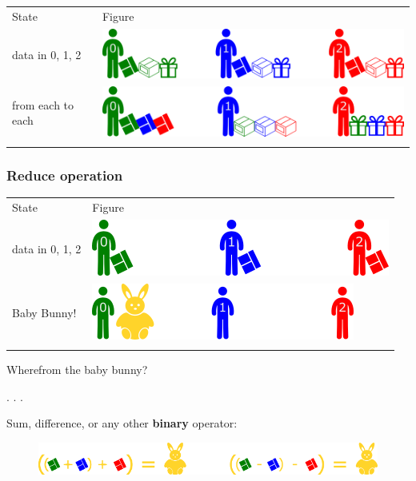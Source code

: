 \begin{longtable}[c]{@{}ll@{}}
\toprule\addlinespace
State & Figure
\\\addlinespace
\midrule\endhead
data in 0, 1, 2 & \includegraphics{06MPI/figures/all2all0.png}
\\\addlinespace
from each to each & \includegraphics{06MPI/figures/all2all1.png}
\\\addlinespace
\bottomrule
\end{longtable}

\subsubsection{Reduce operation}\label{reduce-operation}

\begin{longtable}[c]{@{}ll@{}}
\toprule\addlinespace
State & Figure
\\\addlinespace
\midrule\endhead
data in 0, 1, 2 & \includegraphics{06MPI/figures/collective.png}
\\\addlinespace
Baby Bunny! & \includegraphics{06MPI/figures/reduce1.png}
\\\addlinespace
\bottomrule
\end{longtable}

Wherefrom the baby bunny?

. . .

Sum, difference, or any other \textbf{binary} operator:

\begin{figure}[htbp]
\centering
\includegraphics{06MPI/figures/BunnyOps.png}
\end{figure}

